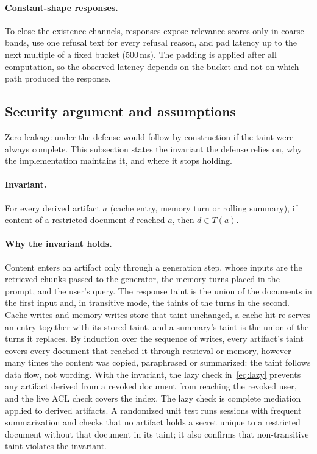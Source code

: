 \paragraph{Constant-shape responses.}
To close the existence channels, responses expose relevance scores only in coarse bands, use one refusal text for every refusal reason, and pad latency up to the next multiple of a fixed bucket (500\,ms). The padding is applied after all computation, so the observed latency depends on the bucket and not on which path produced the response.

\subsection{Security argument and assumptions}
\label{sec:soundness}
Zero leakage under the defense would follow by construction if the taint were always complete. This subsection states the invariant the defense relies on, why the implementation maintains it, and where it stops holding.

\paragraph{Invariant.} For every derived artifact $a$ (cache entry, memory turn or rolling summary), if content of a restricted document $d$ reached $a$, then $d\in T(a)$.

\paragraph{Why the invariant holds.} Content enters an artifact only through a generation step, whose inputs are the retrieved chunks passed to the generator, the memory turns placed in the prompt, and the user's query. The response taint is the union of the documents in the first input and, in transitive mode, the taints of the turns in the second. Cache writes and memory writes store that taint unchanged, a cache hit re-serves an entry together with its stored taint, and a summary's taint is the union of the turns it replaces. By induction over the sequence of writes, every artifact's taint covers every document that reached it through retrieval or memory, however many times the content was copied, paraphrased or summarized: the taint follows data flow, not wording. With the invariant, the lazy check in~\eqref{eq:lazy} prevents any artifact derived from a revoked document from reaching the revoked user, and the live ACL check covers the index. The lazy check is complete mediation~\cite{saltzer1975protection} applied to derived artifacts. A randomized unit test runs sessions with frequent summarization and checks that no artifact holds a secret unique to a restricted document without that document in its taint; it also confirms that non-transitive taint violates the invariant.

